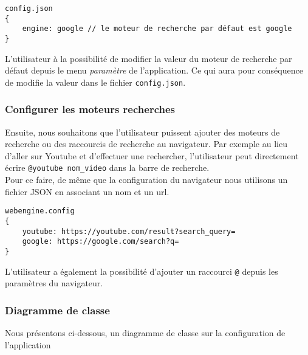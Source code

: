 \documentclass[10pt,a4paper]{article}
\begin{document}
\begin{verbatim}
config.json
{
    engine: google // le moteur de recherche par défaut est google
}
\end{verbatim}

L'utilisateur à la possibilité de modifier la valeur du moteur de recherche par défaut depuis le menu \textit{paramètre} de l'application. Ce qui aura pour conséquence de modifie la valeur dans le fichier \verb|config.json|.

\subsubsection{Configurer les moteurs recherches}
Ensuite, nous souhaitons que l'utilisateur puissent ajouter des moteurs de recherche ou des raccourcis de recherche au navigateur. Par exemple au lieu d'aller sur Youtube et d'effectuer une rechercher, l'utilisateur peut directement écrire \verb|@youtube nom_video| dans la barre de recherche. \\
Pour ce faire, de même que la configuration du navigateur nous utilisons un fichier JSON en associant un nom et un url.
\begin{verbatim}
webengine.config
{
    youtube: https://youtube.com/result?search_query=
    google: https://google.com/search?q=
}
\end{verbatim}

L'utilisateur a également la possibilité d'ajouter un raccourci \verb|@| depuis les paramètres du navigateur.


\subsubsection{Diagramme de classe}
Nous présentons ci-dessous, un diagramme de classe sur la configuration de l'application
\end{document}
